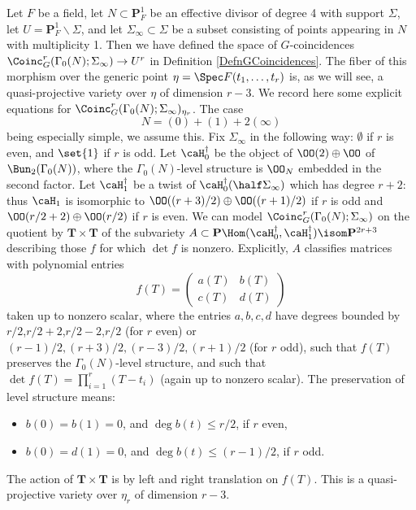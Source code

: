 \documentclass{article}
\def\P{\mathbf{P}}
\begin{document}
Let $F$ be a field, let $N\subset \P^1_F$ be an effective divisor of degree 4 with support $\Sigma$,  let $U=\P^1_F\smallsetminus \Sigma$, and let $\Sigma_\infty\subset \Sigma$ be a subset consisting of points appearing in $N$ with multiplicity 1.  Then we have defined the space of $G$-coincidences $\Coinc^r_G(\Gamma_0(N);\Sigma_\infty)\to U^r$ in Definition \ref{DefnGCoincidences}.  The fiber of this morphism over the generic point $\eta=\Spec F(t_1,\dots,t_r)$ is, as we will see, a quasi-projective variety over $\eta$ of dimension $r-3$. We record here some explicit equations for $\Coinc^r_G(\Gamma_0(N);\Sigma_\infty)_{\eta_r}$.  The case
\[ N = (0)+(1)+2(\infty) \]
being especially simple, we assume this.  Fix $\Sigma_\infty$ in the following way: $\emptyset$ if $r$ is even, and $\set{1}$ if $r$ is odd.   Let $\caH_0^\dagger$ be the object of $\OO(2)\oplus \OO$ of $\Bun_2(\Gamma_0(N))$, where the $\Gamma_0(N)$-level structure is $\OO_N$ embedded in the second factor.  Let $\caH_1^\dagger$ be a twist of $\caH_0^\dagger(\half \Sigma_\infty)$ which has degree $r+2$:  thus $\caH_1$ is isomorphic to $\OO((r+3)/2)\oplus \OO((r+1)/2)$ if $r$ is odd and $\OO(r/2+2)\oplus\OO(r/2)$ if $r$ is even.  
We can model $\Coinc^r_G(\Gamma_0(N);\Sigma_\infty)$ on the quotient by $\mathbf{T}\times\mathbf{T}$ of the subvariety $A\subset \P\Hom(\caH_0^\dagger,\caH^\dagger_1)\isom \P^{2r+3}$ describing those $f$ for which $\det f$ is nonzero.  Explicitly, $A$ classifies matrices with polynomial entries
\[ 
f(T)=\begin{pmatrix}
a(T) & b(T) \\
c(T) & d(T)
\end{pmatrix}
\]
taken up to nonzero scalar, where the entries $a,b,c,d$ have degrees bounded by $r/2$,$r/2+2$,$r/2-2$,$r/2$ (for $r$ even) or 
$(r-1)/2,(r+3)/2,(r-3)/2,(r+1)/2$ (for $r$ odd), such that $f(T)$ preserves the $\Gamma_0(N)$-level structure, and such that $\det f(T)=\prod_{i=1}^r (T-t_i)$ (again up to nonzero scalar).  The preservation of level structure means:
\begin{itemize}
\item $b(0)=b(1)=0$, and $\deg b(t)\leq r/2$, if $r$ even,
\item $b(0)=d(1)=0$, and $\deg b(t)\leq (r-1)/2$, if $r$ odd.
\end{itemize}
The action of $\mathbf{T}\times\mathbf{T}$ is by left and right translation on $f(T)$.    This is a quasi-projective variety over $\eta_r$ of dimension $r-3$. 
\end{document}
